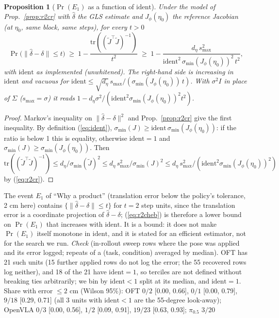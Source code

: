 \documentclass{article}
\newtheorem{proposition}{Proposition}
\newcommand{\ident}{\mathrm{ident}}
\newcommand{\pihalf}{$\pi_{0.5}$}
\begin{document}
\begin{proposition}[$\Pr(E_1)$ as a function of $\ident$]
\label{prop:r2cheb}
Under the model of Prop.~\ref{prop:r2cr} with $\hat\delta$ the GLS estimate and $J_\phi(\eta_0)$ the reference
Jacobian (at $\eta_0$, same block, same steps), for every $t > 0$
\begin{equation}
\Pr\big(\|\hat\delta - \delta\| \le t\big) \;\ge\; 1 - \frac{\mathrm{tr}((\tilde J^\top\tilde J)^{-1})}{t^2}
\;\ge\; 1 - \frac{d_\eta\,s_{\max}^2}{\ident^2\,\sigma_{\min}(J_\phi(\eta_0))^2\,t^2} ,
\label{eq:r2cheb}
\end{equation}
with $\ident$ as implemented (unwhitened). The right-hand side is increasing in $\ident$ and vacuous for $\ident \le
\sqrt{d_\eta}\,s_{\max}/(\sigma_{\min}(J_\phi(\eta_0))\,t)$. With $\sigma^2 I$ in place of $\Sigma$ ($s_{\max} =
\sigma$) it reads $1 - d_\eta\sigma^2/(\ident^2\sigma_{\min}(J_\phi(\eta_0))^2t^2)$.
\end{proposition}
\begin{proof}
Markov's inequality on $\|\hat\delta - \delta\|^2$ and Prop.~\ref{prop:r2cr} give the first inequality. By definition
(\ref{eq:ident}), $\sigma_{\min}(J) \ge \ident\,\sigma_{\min}(J_\phi(\eta_0))$: if the ratio is below 1 this is
equality, otherwise $\ident = 1$ and $\sigma_{\min}(J) \ge \sigma_{\min}(J_\phi(\eta_0))$. Then
$\mathrm{tr}((\tilde J^\top\tilde J)^{-1}) \le d_\eta/\sigma_{\min}(\tilde J)^2 \le d_\eta\,s_{\max}^2/\sigma_{\min}(J)^2
\le d_\eta\,s_{\max}^2/(\ident^2\sigma_{\min}(J_\phi(\eta_0))^2)$ by (\ref{eq:r2cr}).
\end{proof}
The event $E_1$ of ``Why a product'' (translation error below the policy's tolerance, 2 cm here) contains
$\{\|\hat\delta - \delta\| \le t\}$ for $t = 2$ step units, since the translation error is a coordinate projection of
$\hat\delta - \delta$; (\ref{eq:r2cheb}) is therefore a lower bound on $\Pr(E_1)$ that increases with $\ident$. It is a
bound: it does not make $\Pr(E_1)$ itself monotone in $\ident$, and it is stated for an efficient estimator, not for
the search we run. \emph{Check} (in-rollout sweep rows where the pose was applied and its error logged; repeats of a (task,
condition) averaged by median). OFT has 21 such units (15 further applied rows do not log the error; the 55
recovered rows log neither), and 18 of the 21 have $\ident = 1$, so terciles are not defined without breaking ties
arbitrarily; we bin by $\ident < 1$ split at its median, and $\ident = 1$. Share with error $\le 2$ cm (Wilson 95\%):
OFT $0/2$ [0.00, 0.66], $0/1$ [0.00, 0.79], $9/18$ [0.29, 0.71] (all 3 units with $\ident < 1$ are the 55-degree look-away); OpenVLA $0/3$ [0.00, 0.56], $1/2$ [0.09, 0.91], $19/23$ [0.63, 0.93]; \pihalf{} $3/20$
\end{document}
